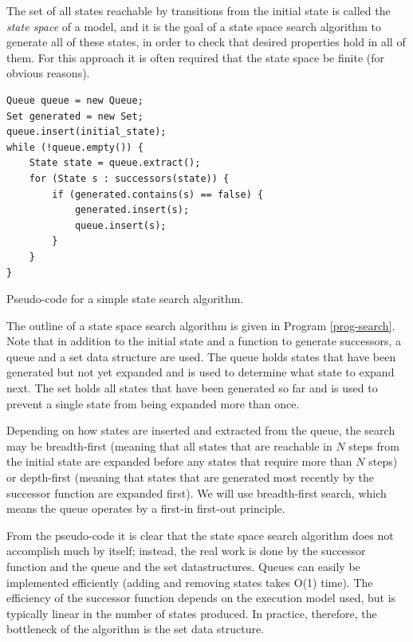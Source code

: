 \documentclass{acm_proc_article-sp}
\begin{document}
The set of all states reachable by transitions from the initial state is called
the \emph{state space} of a model, and it is the goal of a state space search
algorithm to generate all of these states, in order to check that desired
properties hold in all of them. For this approach it is often required that
the state space be finite (for obvious reasons).

\begin{program}
\begin{verbatim}
Queue queue = new Queue;
Set generated = new Set;
queue.insert(initial_state);
while (!queue.empty()) {
    State state = queue.extract();
    for (State s : successors(state)) {
        if (generated.contains(s) == false) {
            generated.insert(s);
            queue.insert(s);
        }
    }
}
\end{verbatim}
\caption{Pseudo-code for a simple state search algorithm.}
\label{prog-search}
\end{program}

The outline of a state space search algorithm is given in Program
\ref{prog-search}. Note that in addition to the initial state and a function
to generate successors, a queue and a set data structure are used. The queue
holds states that have been generated but not yet expanded and is used to
determine what state to expand next. The set holds all states that have been
generated so far and is used to prevent a single state from being expanded
more than once.

Depending on how states are inserted and extracted from the queue, the search
may be breadth-first (meaning that all states that are reachable in $N$ steps
from the initial state are expanded before any states that require more than
$N$ steps) or depth-first (meaning that states that are generated most recently
by the successor function are expanded first). We will use breadth-first
search, which means the queue operates by a first-in first-out principle.

From the pseudo-code it is clear that the state space search algorithm does not
accomplish much by itself; instead, the real work is done by the successor
function and the queue and the set datastructures. Queues can easily be
implemented efficiently (adding and removing states takes O(1) time).
The efficiency of the successor function depends on the execution model used,
but is typically linear in the number of states produced. In practice,
therefore, the bottleneck of the algorithm is the set data structure.
\end{document}
